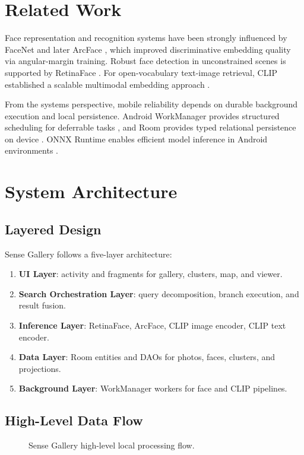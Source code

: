 \documentclass[conference]{IEEEtran}
\begin{document}
\section{Related Work}
Face representation and recognition systems have been strongly influenced by FaceNet \cite{schroff2015facenet} and later ArcFace \cite{deng2019arcface}, which improved discriminative embedding quality via angular-margin training. Robust face detection in unconstrained scenes is supported by RetinaFace \cite{deng2020retinaface}. For open-vocabulary text-image retrieval, CLIP established a scalable multimodal embedding approach \cite{radford2021clip}.

From the systems perspective, mobile reliability depends on durable background execution and local persistence. Android WorkManager provides structured scheduling for deferrable tasks \cite{android_workmanager}, and Room provides typed relational persistence on device \cite{android_room}. ONNX Runtime enables efficient model inference in Android environments \cite{onnxruntime_android}.

\section{System Architecture}
\subsection{Layered Design}
Sense Gallery follows a five-layer architecture:
\begin{enumerate}
\item \textbf{UI Layer}: activity and fragments for gallery, clusters, map, and viewer.
\item \textbf{Search Orchestration Layer}: query decomposition, branch execution, and result fusion.
\item \textbf{Inference Layer}: RetinaFace, ArcFace, CLIP image encoder, CLIP text encoder.
\item \textbf{Data Layer}: Room entities and DAOs for photos, faces, clusters, and projections.
\item \textbf{Background Layer}: WorkManager workers for face and CLIP pipelines.
\end{enumerate}

\subsection{High-Level Data Flow}
\begin{figure}[H]
\centering
\setlength{\fboxsep}{6pt}
\caption{Sense Gallery high-level local processing flow.}
\label{fig:flow}
\end{figure}
\end{document}

